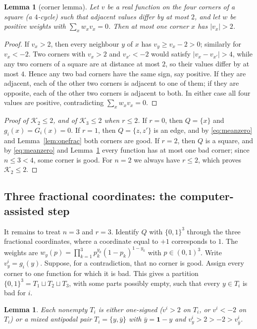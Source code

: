 \documentclass[11pt,letterpaper]{article}
\newtheorem{lemma}[theorem]{Lemma}
\theoremstyle{definition}
\begin{document}
\begin{lemma}[corner lemma]\label{lem:corner}
Let $v$ be a real function on the four corners of a square (a $4$-cycle) such that adjacent
values differ by at most $2$, and let $w$ be positive weights with $\sum_xw_xv_x=0$. Then at most
one corner $x$ has $|v_x|>2$.
\end{lemma}

\begin{proof}
If $v_x>2$, then every neighbour $y$ of $x$ has $v_y\ge v_x-2>0$; similarly for $v_x<-2$. Two
corners with $v_x>2$ and $v_{x'}<-2$ would satisfy $|v_x-v_{x'}|>4$, while any two corners of a
square are at distance at most $2$, so their values differ by at most $4$. Hence any two bad
corners have the same sign, say positive. If they are adjacent, each of the other two corners is
adjacent to one of them; if they are opposite, each of the other two corners is adjacent to both.
In either case all four values are positive, contradicting $\sum_xw_xv_x=0$.
\end{proof}

\begin{proof}[Proof of $\mathcal{K}_2\le2$, and of $\mathcal{K}_3\le2$ when $r\le2$]
If $r=0$, then $Q=\{x\}$ and $g_i(x)=G_i(x)=0$. If $r=1$, then $Q=\{z,z'\}$ is an edge, and by
\eqref{eq:meanzero} and Lemma~\ref{lem:onefrac} both corners are good. If $r=2$, then $Q$ is a
square, and by \eqref{eq:meanzero} and Lemma~\ref{lem:corner} every function has at most one bad
corner; since $n\le3<4$, some corner is good. For $n=2$ we always have $r\le2$, which proves
$\mathcal{K}_2\le2$.
\end{proof}

\subsection{Three fractional coordinates: the computer-assisted step}\label{sec:k3}

It remains to treat $n=3$ and $r=3$. Identify $Q$ with $\{0,1\}^3$ through the three fractional
coordinates, where a coordinate equal to $+1$ corresponds to $1$. The weights are
$w_y(p)=\prod_{k=1}^3p_k^{y_k}(1-p_k)^{1-y_k}$ with $p\in(0,1)^3$. Write $v^i_y=g_i(y)$.
Suppose, for a contradiction, that no corner is good. Assign every corner to one function for
which it is bad. This gives a partition $\{0,1\}^3=T_1\sqcup T_2\sqcup T_3$, with some parts
possibly empty, such that every $y\in T_i$ is bad for $i$.

\begin{lemma}\label{lem:parts}
Each nonempty $T_i$ is either \emph{one-signed} ($v^i>2$ on $T_i$, or $v^i<-2$ on $T_i$) or a
\emph{mixed antipodal pair} $T_i=\{y,\bar y\}$ with $\bar y=\mathbf 1-y$ and $v^i_y>2>-2>v^i_{\bar
y}$.
\end{lemma}
\end{document}
